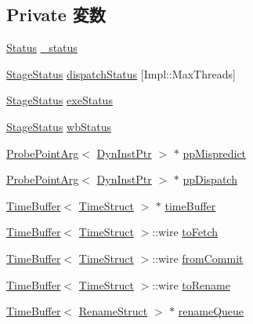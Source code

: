 \subsection*{Private 変数}
\begin{DoxyCompactItemize}
\item 
\hyperlink{classDefaultIEW_a67a0db04d321a74b7e7fcfd3f1a3f70b}{Status} \hyperlink{classDefaultIEW_a6cdf6e6db875a442f3ab6db542bd2bb5}{\_\-status}
\item 
\hyperlink{classDefaultIEW_add44b42ba3608b213fc0986c4aee6018}{StageStatus} \hyperlink{classDefaultIEW_a2ab1f59ca15f38f95b082415285ee273}{dispatchStatus} \mbox{[}Impl::MaxThreads\mbox{]}
\item 
\hyperlink{classDefaultIEW_add44b42ba3608b213fc0986c4aee6018}{StageStatus} \hyperlink{classDefaultIEW_ab8c04349b85b4d9bf03a601deee720b4}{exeStatus}
\item 
\hyperlink{classDefaultIEW_add44b42ba3608b213fc0986c4aee6018}{StageStatus} \hyperlink{classDefaultIEW_abc3a4c25708a2663da1d26bf7fc045a0}{wbStatus}
\item 
\hyperlink{classProbePointArg}{ProbePointArg}$<$ \hyperlink{classDefaultIEW_a028ce10889c5f6450239d9e9a7347976}{DynInstPtr} $>$ $\ast$ \hyperlink{classDefaultIEW_a78ed80917b5ebd419bf614b2e3b8f2cb}{ppMispredict}
\item 
\hyperlink{classProbePointArg}{ProbePointArg}$<$ \hyperlink{classDefaultIEW_a028ce10889c5f6450239d9e9a7347976}{DynInstPtr} $>$ $\ast$ \hyperlink{classDefaultIEW_acf84d288c6bc7f3ffbb09eb080dcbb7b}{ppDispatch}
\item 
\hyperlink{classTimeBuffer}{TimeBuffer}$<$ \hyperlink{structTimeStruct}{TimeStruct} $>$ $\ast$ \hyperlink{classDefaultIEW_a83f9ee976e732665aeb08dbc19acfd45}{timeBuffer}
\item 
\hyperlink{classTimeBuffer}{TimeBuffer}$<$ \hyperlink{structTimeStruct}{TimeStruct} $>$::wire \hyperlink{classDefaultIEW_acc94cfae2a67b5dbb0e74e81c24a3b6e}{toFetch}
\item 
\hyperlink{classTimeBuffer}{TimeBuffer}$<$ \hyperlink{structTimeStruct}{TimeStruct} $>$::wire \hyperlink{classDefaultIEW_a0055a92bd94eda21c2641d46ff013dac}{fromCommit}
\item 
\hyperlink{classTimeBuffer}{TimeBuffer}$<$ \hyperlink{structTimeStruct}{TimeStruct} $>$::wire \hyperlink{classDefaultIEW_a0f41e335a1b036cd36ccec9716b2ee2b}{toRename}
\item 
\hyperlink{classTimeBuffer}{TimeBuffer}$<$ \hyperlink{classDefaultIEW_a0c2a89ad2edad9ad605d0461f9b132a5}{RenameStruct} $>$ $\ast$ \hyperlink{classDefaultIEW_ae9b536282159ba75153a223be77515ba}{renameQueue}

\end{DoxyCompactItemize}
